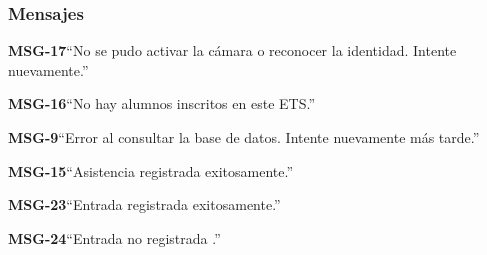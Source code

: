 \subsubsection{Mensajes}

\begin{Citemize}
    \item {\bf MSG-17}{``No se pudo activar la cámara o reconocer la identidad. Intente nuevamente.''}
    \item {\bf MSG-16}{``No hay alumnos inscritos en este ETS.''}
    \item {\bf MSG-9}{``Error al consultar la base de datos. Intente nuevamente más tarde.''}
    \item {\bf MSG-15}{``Asistencia registrada exitosamente.''}
    \item {\bf MSG-23}{``Entrada registrada exitosamente.''}
    \item {\bf MSG-24}{``Entrada no registrada .''}
\end{Citemize}

